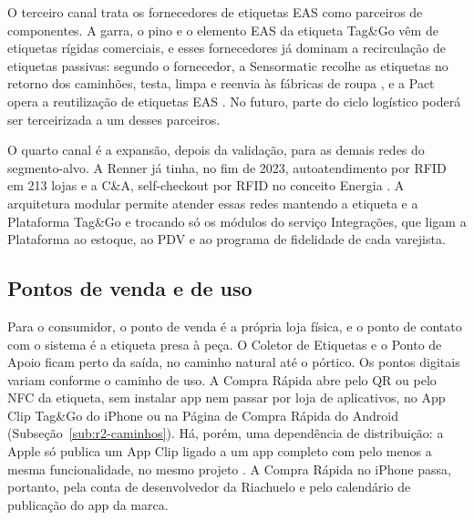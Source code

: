 O terceiro canal trata os fornecedores de etiquetas EAS como parceiros de componentes. A garra, o pino e o elemento EAS da etiqueta Tag\&Go vêm de etiquetas rígidas comerciais, e esses fornecedores já dominam a recirculação de etiquetas passivas: segundo o fornecedor, a Sensormatic recolhe as etiquetas no retorno dos caminhões, testa, limpa e reenvia às fábricas de roupa \cite{sensormatic2024recirculacao}, e a Pact opera a reutilização de etiquetas EAS \cite{pact2026etiquetas}. No futuro, parte do ciclo logístico poderá ser terceirizada a um desses parceiros.

O quarto canal é a expansão, depois da validação, para as demais redes do segmento-alvo. A Renner já tinha, no fim de 2023, autoatendimento por RFID em 213 lojas \cite{consumidormoderno2025renner} e a C\&A, self-checkout por RFID no conceito Energia \cite{brazileconomy2025cea}. A arquitetura modular permite atender essas redes mantendo a etiqueta e a Plataforma Tag\&Go e trocando só os módulos do serviço Integrações, que ligam a Plataforma ao estoque, ao PDV e ao programa de fidelidade de cada varejista.

\subsection{Pontos de venda e de uso}
\label{sub:r2-pontos}

Para o consumidor, o ponto de venda é a própria loja física, e o ponto de contato com o sistema é a etiqueta presa à peça. O Coletor de Etiquetas e o Ponto de Apoio ficam perto da saída, no caminho natural até o pórtico. Os pontos digitais variam conforme o caminho de uso. A Compra Rápida abre pelo QR ou pelo NFC da etiqueta, sem instalar app nem passar por loja de aplicativos, no App Clip Tag\&Go do iPhone ou na Página de Compra Rápida do Android (Subseção~\ref{sub:r2-caminhos}). Há, porém, uma dependência de distribuição: a Apple só publica um App Clip ligado a um app completo com pelo menos a mesma funcionalidade, no mesmo projeto \cite{apple2026appclipcriar}. A Compra Rápida no iPhone passa, portanto, pela conta de desenvolvedor da Riachuelo e pelo calendário de publicação do app da marca.

